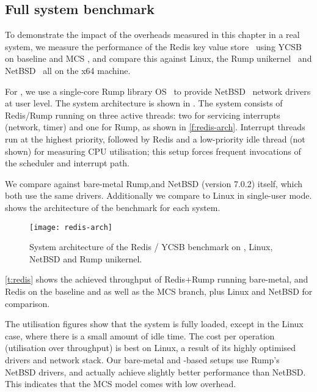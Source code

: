 \subsection{Full system benchmark}
\label{s:evaluation-redis-overhead}

To demonstrate the impact of the overheads measured in this chapter in a real system,
we measure the performance of the Redis key value store~\citep{redis:url} using 
\gls{YCSB}~\citep{Cooper_STRS_10} on baseline and MCS \selfour, and compare this
against Linux, the Rump unikernel~\citep{Kantee_Cormack_14} and 
NetBSD~\citep{NetBSD:url} all on the x64 machine.

For \selfour, we use a single-core Rump library OS~\citep{Kantee_Cormack_14} to provide 
NetBSD~\citep{NetBSD:url} network drivers at user level. The system architecture is 
shown in \label{f:redis-arch}. 
The system consists of Redis/Rump running on three active \selfour threads: 
two for servicing interrupts (network, timer) and one for Rump, as shown in
\autoref{f:redis-arch}. Interrupt threads run at the highest priority,
followed by Redis and a low-priority idle thread (not shown) for measuring CPU utilisation;
this setup forces frequent invocations of the scheduler and interrupt path.

We compare against bare-metal Rump,and
NetBSD (version 7.0.2) itself, which both use the same drivers. Additionally we compare to Linux 
in single-user mode.  shows the architecture of the benchmark for each system. 

 \begin{figure}[ht]
    \centering
    \texttt{[image: redis-arch]}
    \caption{System architecture of the Redis / \gls{YCSB} benchmark on \selfour, 
        Linux, NetBSD and Rump unikernel.}
    \label{f:redis-arch}
\end{figure}


\autoref{t:redis} shows the achieved throughput of Redis+Rump
running  bare-metal, and Redis on the \selfour baseline and as well as the MCS
branch, plus Linux and NetBSD for comparison.

The utilisation figures show that the system is fully loaded, except
in the Linux case, where there is a small amount of idle time. The
cost per operation (utilisation over throughput) is best on Linux, a
result of its highly optimised drivers and network stack. Our
bare-metal and \selfour-based setups use Rump's NetBSD drivers, and
actually achieve slightly better performance than NetBSD. This
indicates that the MCS model comes with low overhead.

